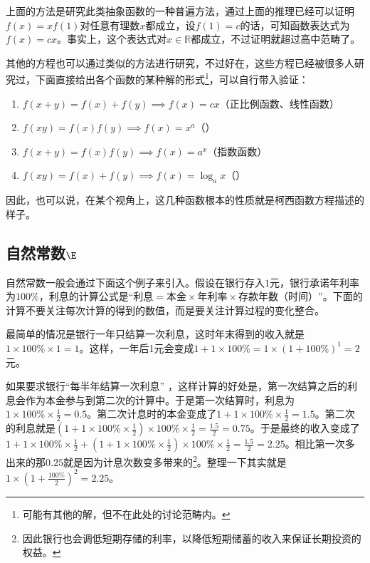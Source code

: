 上面的方法是研究此类抽象函数的一种普遍方法，通过上面的推理已经可以证明$f(x)=xf(1)$对任意有理数$x$都成立，设$f(1)=c$的话，可知函数表达式为$f(x)=cx$。事实上，这个表达式对$x\in\mathbb{R}$都成立，不过证明就超过高中范畴了。

其他的方程也可以通过类似的方法进行研究，不过好在，这些方程已经被很多人研究过，下面直接给出各个函数的某种解的形式\footnote{可能有其他的解，但不在此处的讨论范畴内。}，可以自行带入验证：

\begin{enumerate}
\item $f(x+y)=f(x)+f(y)\implies f(x)=cx$（正比例函数、线性函数）
\item $f(xy)=f(x)f(y)\implies f(x)=x^a$（）
\item $f(x+y)=f(x)f(y)\implies f(x)=a^x$（指数函数）
\item $f(xy)=f(x)+f(y)\implies f(x)=\log_ax$（）
\end{enumerate}

因此，也可以说，在某个视角上，这几种函数根本的性质就是柯西函数方程描述的样子。

\subsection{自然常数$\E$}

自然常数一般会通过下面这个例子来引入。假设在银行存入$1$元，银行承诺年利率为$100\%$，利息的计算公式是“$\text{利息}=\text{本金}\times\text{年利率}\times\text{存款年数（时间）}$”。下面的计算不要关注每次计算的得到的数值，而是要关注计算过程的变化整合。

最简单的情况是银行一年只结算一次利息，这时年末得到的收入就是$1\times100\%\times1=1$。这样，一年后1元会变成$1+1\times100\%=1\times(1+100\%)^1=2$元。

如果要求银行“每半年结算一次利息” ，这样计算的好处是，第一次结算之后的利息会作为本金参与到第二次的计算中。于是第一次结算时，利息为$\displaystyle1\times100\%\times\frac{1}{2}=0.5$。第二次计息时的本金变成了$\displaystyle1+1\times100\%\times\frac{1}{2}=1.5$。第二次的利息就是$\displaystyle(1+1\times100\%\times\frac{1}{2})\times100\%\times\frac{1}{2}=\frac{1.5}{2}=0.75$。于是最终的收入变成了$\displaystyle1+1\times100\%\times\frac{1}{2}+(1+1\times100\%\times\frac{1}{2})\times100\%\times\frac{1}{2}=\frac{1.5}{2}=2.25$。相比第一次多出来的那$0.25$就是因为计息次数变多带来的\footnote{因此银行也会调低短期存储的利率，以降低短期储蓄的收入来保证长期投资的权益。}。整理一下其实就是$1\times(1+\frac{100\%}{2})^2=2.25$。

